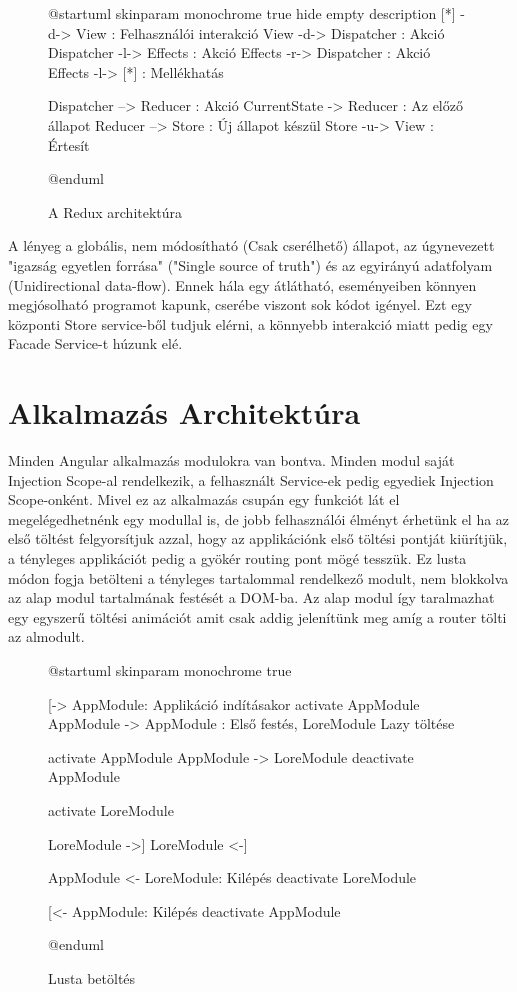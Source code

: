 \begin{figure}[h!]
	\centering
	\begin{plantuml}
		@startuml
		skinparam monochrome true
		hide empty description
		[*] -d-> View : Felhasználói interakció
		View -d-> Dispatcher : Akció
		Dispatcher -l-> Effects : Akció
		Effects -r-> Dispatcher : Akció
		Effects -l-> [*] : Mellékhatás

		Dispatcher --> Reducer : Akció
		CurrentState -> Reducer : Az előző állapot
		Reducer --> Store : Új állapot készül
		Store -u-> View : Értesít

		@enduml
	\end{plantuml}
	\caption{A Redux architektúra}
	\label{fig:redux-architecture}
\end{figure}

A lényeg a globális, nem módosítható (Csak cserélhető) állapot, az úgynevezett "igazság egyetlen forrása" ("Single source of truth") és az egyirányú adatfolyam (Unidirectional data-flow). Ennek hála egy átlátható, eseményeiben könnyen megjósolható programot kapunk, cserébe viszont sok kódot igényel.
Ezt egy központi Store service-ből tudjuk elérni, a könnyebb interakció miatt pedig egy Facade\cite{Facade} Service-t húzunk elé.

\section{Alkalmazás Architektúra}

Minden Angular alkalmazás modulokra van bontva. Minden modul saját Injection Scope-al rendelkezik, a felhasznált Service-ek pedig egyediek Injection Scope-onként. Mivel ez az alkalmazás csupán egy funkciót lát el megelégedhetnénk egy modullal is, de jobb felhasználói élményt érhetünk el ha az első töltést felgyorsítjuk azzal, hogy az applikációnk első töltési pontját kiürítjük, a tényleges applikációt pedig a gyökér routing pont mögé tesszük. Ez lusta módon \cite{LazyLoad} fogja betölteni a tényleges tartalommal rendelkező modult, nem blokkolva az alap modul tartalmának festését a DOM-ba. Az alap modul így taralmazhat egy egyszerű töltési animációt amit csak addig jelenítünk meg amíg a router tölti az almodult.

\begin{figure}[h!]
	\centering
	\begin{plantuml}
		@startuml
		skinparam monochrome true

		[-> AppModule: Applikáció indításakor
		activate AppModule
		AppModule -> AppModule : Első festés, LoreModule Lazy töltése

		activate  AppModule
		AppModule -> LoreModule
		deactivate AppModule

		activate LoreModule

		LoreModule ->]
		LoreModule <-]


		AppModule <- LoreModule: Kilépés
		deactivate LoreModule

		[<- AppModule: Kilépés
		deactivate AppModule

		@enduml


	\end{plantuml}
	\caption{Lusta betöltés}
	\label{fig:lazy-loading}
\end{figure}


